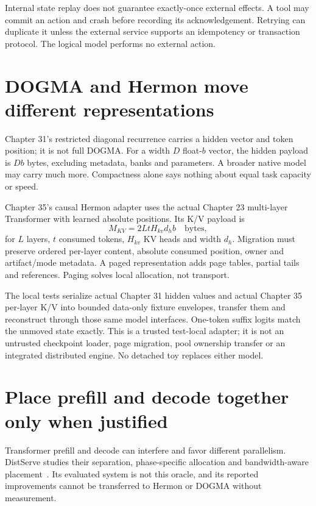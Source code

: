 Internal state replay does not guarantee exactly-once external effects. A tool
may commit an action and crash before recording its acknowledgement. Retrying
can duplicate it unless the external service supports an idempotency or
transaction protocol. The logical model performs no external action.

\section{DOGMA and Hermon move different representations}
\label{evod46:representations}
Chapter 31's restricted diagonal recurrence carries a hidden vector and token
position; it is not full DOGMA. For a width $D$ float-$b$ vector, the hidden
payload is $Db$ bytes, excluding metadata, banks and parameters. A broader
native model may carry much more. Compactness alone says nothing about equal
task capacity or speed.

Chapter 35's causal Hermon adapter uses the actual Chapter 23 multi-layer
Transformer with learned absolute positions. Its K/V payload is
\[
 M_{KV}=2LtH_{kv}d_hb\quad\text{bytes},
\]
for $L$ layers, $t$ consumed tokens, $H_{kv}$ KV heads and width $d_h$.
Migration must preserve ordered per-layer content, absolute consumed position,
owner and artifact/mode metadata. A paged representation adds page tables,
partial tails and references. Paging solves local allocation, not transport.

The local tests serialize actual Chapter 31 hidden values and actual Chapter
35 per-layer K/V into bounded data-only fixture envelopes, transfer them and
reconstruct through those same model interfaces. One-token suffix logits
match the unmoved state exactly. This is a trusted test-local adapter; it is
not an untrusted checkpoint loader, page migration, pool ownership transfer
or an integrated distributed engine. No detached toy replaces either model.

\section{Place prefill and decode together only when justified}
\label{evod46:pd}
Transformer prefill and decode can interfere and favor different parallelism.
DistServe studies their separation, phase-specific allocation and bandwidth-aware
placement~\cite{distserve46}. Its evaluated system is not this oracle, and its
reported improvements cannot be transferred to Hermon or DOGMA without measurement.

